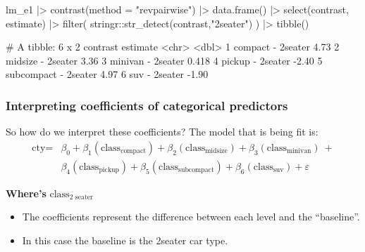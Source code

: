 \documentclass[a4paper]{article}
\begin{document}
\hspace{0.02\textwidth}
\begin{minipage}[t]{0.49\textwidth}
\begin{Schunk}
\begin{Sinput}
lm_e1 |> 
  contrast(method = "revpairwise") |> 
  data.frame() |> 
  select(contrast, estimate) |> 
  filter(
    stringr::str_detect(contrast,"2seater")
  ) |> tibble()
\end{Sinput}
\begin{Soutput}
# A tibble: 6 x 2
  contrast             estimate
  <chr>                   <dbl>
1 compact - 2seater       4.73 
2 midsize - 2seater       3.36 
3 minivan - 2seater       0.418
4 pickup - 2seater       -2.40 
5 subcompact - 2seater    4.97 
6 suv - 2seater          -1.90 
\end{Soutput}
\end{Schunk}
\end{minipage}
\subsubsection{Interpreting coefficients of categorical predictors}
So how do we interpret these coefficients? The model that is being fit is:
\begin{align*}
	\text{cty} ={}& \beta_{0} + \beta_{1}(\text{class}_{\text{compact}}) + \beta_{2}(\text{class}_{\text{midsize}}) + \beta_{3}(\text{class}_{\text{minivan}})\ + \\
	& \beta_{4}(\text{class}_{\text{pickup}}) + \beta_{5}(\text{class}_{\text{subcompact}}) + \beta_{6}(\text{class}_{\text{suv}}) + \varepsilon
\end{align*}
\begin{greenbox}
	\textbf{Where's} \( \text{class}_{\text{2 seater}} \) 
\end{greenbox}
\begin{itemize}
	\item The coefficients represent the difference between each level and the ``baseline''.
	\item In this case the baseline is the 2seater car type.
\end{itemize}
\end{document}

